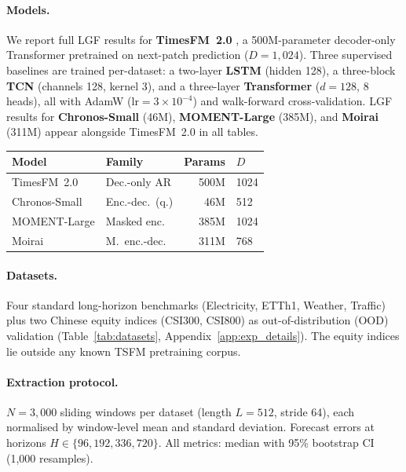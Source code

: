\documentclass[10pt]{article}
\theoremstyle{definition}
\theoremstyle{remark}
\begin{document}
\paragraph{Models.}
\noindent
\begin{minipage}[t]{0.49\textwidth}
\vspace{0pt}
We report full LGF results for \textbf{TimesFM~2.0}
\citep{das2024timesfm,das2025timesfm2}, a 500M-parameter decoder-only
Transformer pretrained on next-patch prediction ($D{=}1{,}024$).
Three supervised baselines are trained per-dataset: a two-layer \textbf{LSTM}
(hidden 128), a three-block \textbf{TCN} (channels 128, kernel 3), and a
three-layer \textbf{Transformer} ($d{=}128$, 8 heads), all with AdamW
($\mathrm{lr}{=}3{\times}10^{-4}$) and walk-forward cross-validation.
LGF results for \textbf{Chronos-Small} \citep{ansari2024chronos} (46M),
\textbf{MOMENT-Large} \citep{goswami2024moment} (385M), and \textbf{Moirai}
\citep{woo2024moirai} (311M) appear alongside TimesFM~2.0 in all tables.
\end{minipage}%
\hfill
\begin{minipage}[t]{0.47\textwidth}
\vspace{0pt}
\centering
{}
\label{tab:models}
\small\setlength{\tabcolsep}{2pt}
\begin{tabular}{llrl}
\toprule
\textbf{Model} & \textbf{Family} & \textbf{Params} & \textbf{$D$}\\
\midrule
TimesFM~2.0   & Dec.-only AR    & 500M & 1024\\
Chronos-Small & Enc.-dec.\ (q.) &  46M &  512\\
MOMENT-Large  & Masked enc.     & 385M & 1024\\
Moirai        & M.\ enc.-dec.   & 311M &  768\\
\bottomrule
\end{tabular}
\end{minipage}

\paragraph{Datasets.}
Four standard long-horizon benchmarks (Electricity, ETTh1, Weather, Traffic)
plus two Chinese equity indices (CSI300, CSI800) as out-of-distribution (OOD)
validation (Table~\ref{tab:datasets}, Appendix~\ref{app:exp_details}).
The equity indices lie outside any known TSFM pretraining corpus.

\paragraph{Extraction protocol.}
$N{=}3{,}000$ sliding windows per dataset (length $L{=}512$, stride 64),
each normalised by window-level mean and standard deviation.
Forecast errors at horizons $H \in \{96, 192, 336, 720\}$.
All metrics: median with 95\% bootstrap CI (1{,}000 resamples).
\end{document}
